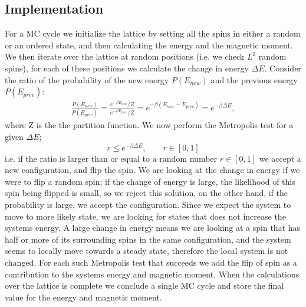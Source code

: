 \documentclass{emulateapj}
\begin{document}
\subsection{Implementation}
For a MC cycle we initialize the lattice by setting all the spins in either a random or an ordered state, and then calculating the energy and the magnetic moment. We then iterate over the lattice at random positions (i.e. we check $L^2$ random spins), for each of these positions we calculate the change in energy $\Delta E$. Consider the ratio of the probability of the new energy $P\left(E_{new}\right)$ and the previous energy $P\left(E_{prev}\right)$:
%
\begin{align*}
    \frac{P\left(E_{new}\right)}{P\left(E_{prev}\right)} = \frac{e^{-\beta E_{new}}/Z}{e^{-\beta E_{prev}}/Z} = e^{-\beta\left(E_{new} - E_{prev}\right)} = e^{-\beta\Delta E},
\end{align*}
%
where Z is the the partition function. We now perform the Metropolis test for a given $\Delta E$;
%
\begin{equation*}
    r \leq e^{-\beta \Delta E}, \qquad r \in [0,1]
\end{equation*}
%
i.e. if the ratio is larger than or equal to a random number $r \in [0,1]$ we accept a new configuration, and flip the spin.  We are looking at the change in energy if we were to flip a random spin; if the change of energy is large, the likelihood of this spin being flipped is small, so we reject this solution, on the other hand, if the probability is large, we accept the configuration. Since we expect the system to move to more likely state, we are looking for states that does not increase the systems energy. A large change in energy means we are looking at a spin that has half or more of its surrounding spins in the same configuration, and the system seems to locally move towards a steady state, therefore the local system is not changed. For each such Metropolis test that succeeds we add the flip of spin as a contribution to the systems energy and magnetic moment. When the calculations over the lattice is complete we conclude a single MC cycle and store the final value for the energy and magnetic moment.
\end{document}
